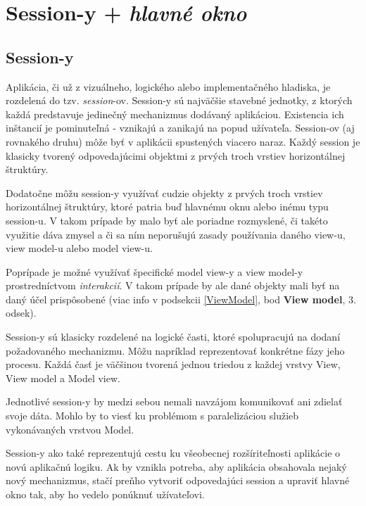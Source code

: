 \section{Session-y + \textit{hlavné okno}}\label{sessions_hlavne_okno}

\subsection{Session-y}

Aplikácia, či už z vizuálneho, logického alebo implementačného hladiska, je rozdelená do tzv. \textit{session}-ov. Session-y sú najväčšie stavebné jednotky, z ktorých každá predstavuje jedinečný mechanizmus dodávaný aplikáciou. Existencia ich inštancií je pominuteľná - vznikajú a zanikajú na popud užívateľa. Session-ov (aj rovnakého druhu) môže byť v aplikácii spustených viacero naraz. Každý session je klasicky tvorený odpovedajúcimi objektmi z prvých troch vrstiev horizontálnej štruktúry. 

Dodatočne môžu session-y využívať cudzie objekty z prvých troch vrstiev horizontálnej štruktúry, ktoré patria buď hlavnému oknu alebo inému typu session-u. V takom prípade by malo byť ale poriadne rozmyslené, či takéto  využitie dáva zmysel a či sa ním neporušujú zasady používania daného view-u, view model-u alebo model view-u. 

Poprípade je možné využívať špecifické model view-y a view model-y prostredníctvom \textit{interakcií}. V takom prípade by ale dané objekty mali byť na daný účel prispôsobené (viac info v podsekcii \ref{ViewModel}, bod \textbf{View model}, 3. odsek).

Session-y sú klasicky rozdelené na logické časti, ktoré spolupracujú na dodaní požadovaného mechanizmu. Môžu napríklad reprezentovať konkrétne fázy jeho procesu. Každá časť je väčšinou tvorená jednou triedou z každej vrstvy View, View model a Model view.  %

Jednotlivé session-y by medzi sebou nemali navzájom komunikovať ani zdielať svoje dáta. Mohlo by to viesť ku problémom s paralelizáciou služieb vykonávaných vrstvou Model.

Session-y ako také reprezentujú cestu ku všeobecnej rozšíriteľnosti aplikácie o novú aplikačnú logiku. Ak by vznikla potreba, aby aplikácia obsahovala nejaký nový mechanizmus, stačí preňho vytvoriť odpovedajúci session a upraviť hlavné okno tak, aby ho vedelo ponúknuť užívateľovi.  


